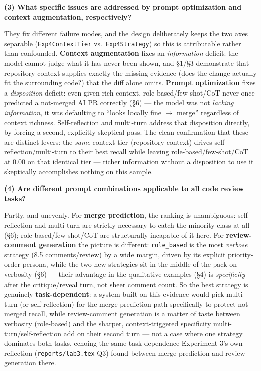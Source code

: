 \documentclass{experimentreport}
\begin{document}
{\textbf{(3) What specific issues are addressed by prompt optimization and context augmentation,
respectively?}

They fix different failure modes, and the design deliberately keeps the two axes separable
(\texttt{Exp4ContextTier} vs.\ \texttt{Exp4Strategy}) so this is attributable rather than confounded.
\textbf{Context augmentation} fixes an \emph{information} deficit: the model cannot judge what it has
never been shown, and \S1/\S3 demonstrate that repository context supplies exactly the missing
evidence (does the change actually fit the surrounding code?) that the diff alone omits. \textbf{Prompt
optimization} fixes a \emph{disposition} deficit: even given rich context, role-based/few-shot/CoT
never once predicted a not-merged AI PR correctly (\S6) --- the model was not \emph{lacking
information}, it was defaulting to ``looks locally fine $\rightarrow$ merge'' regardless of context
richness. Self-reflection and multi-turn address that disposition directly, by forcing a second,
explicitly skeptical pass. The clean confirmation that these are distinct levers: the \emph{same}
context tier (repository context) drives self-reflection/multi-turn to their best recall while
leaving role-based/few-shot/CoT at 0.00 on that identical tier --- richer information without a
disposition to use it skeptically accomplishes nothing on this sample.

\textbf{(4) Are different prompt combinations applicable to all code review tasks?}

Partly, and unevenly. For \textbf{merge prediction}, the ranking is unambiguous: self-reflection and
multi-turn are strictly necessary to catch the minority class at all (\S6); role-based/few-shot/CoT
are structurally incapable of it here. For \textbf{review-comment generation} the picture is
different: \texttt{role\_based} is the most \emph{verbose} strategy (8.5 comments/review) by a wide
margin, driven by its explicit priority-order persona, while the two new strategies sit in the
middle of the pack on verbosity (\S6) --- their advantage in the qualitative examples (\S4) is
\emph{specificity} after the critique/reveal turn, not sheer comment count. So the best strategy is
genuinely \textbf{task-dependent}: a system built on this evidence would pick multi-turn (or
self-reflection) for the merge-prediction path specifically to protect not-merged recall, while
review-comment generation is a matter of taste between verbosity (role-based) and the sharper,
context-triggered specificity multi-turn/self-reflection add on their second turn --- not a case
where one strategy dominates both tasks, echoing the same task-dependence Experiment 3's own
reflection (\texttt{reports/lab3.tex} Q3) found between merge prediction and review generation there.

}
\end{document}
